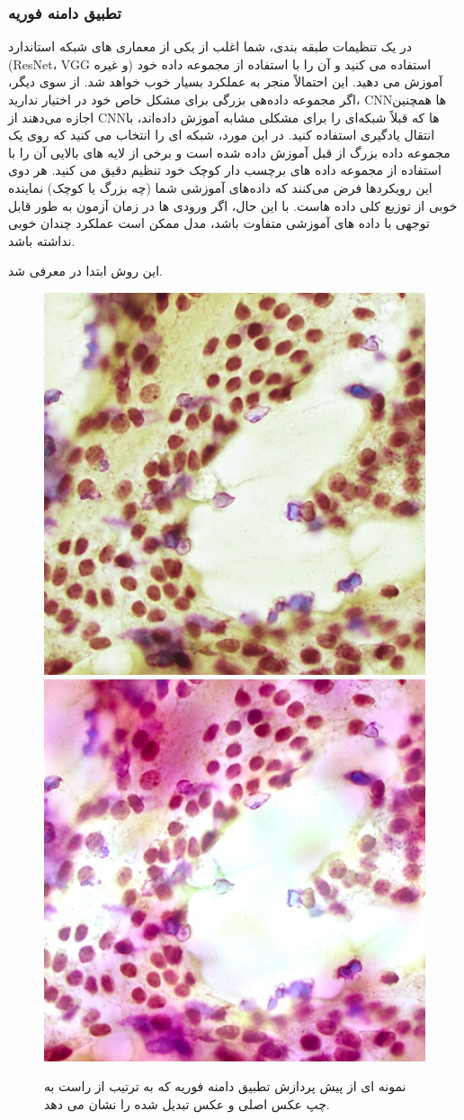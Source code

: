 \subsubsection{تطبیق دامنه فوریه}
در یک تنظیمات طبقه بندی، شما اغلب از یکی از معماری های شبکه استاندارد (ResNet، VGG و غیره) استفاده می کنید و آن را با استفاده از مجموعه داده خود آموزش می دهید.
این احتمالاً منجر به عملکرد بسیار خوب خواهد شد.
از سوی دیگر، اگر مجموعه داده‌هی بزرگی برای مشکل خاص خود در اختیار ندارید، CNN‌ها همچنین اجازه می‌دهند از CNNها که قبلاً شبکه‌ای را برای مشکلی مشابه آموزش داده‌اند، با انتقال یادگیری استفاده کنید.
در این مورد، شبکه ای را انتخاب می کنید که روی یک مجموعه داده بزرگ از قبل آموزش داده شده است و برخی از لایه های بالایی آن را با استفاده از مجموعه داده های برچسب دار کوچک خود تنظیم دقیق می کنید.
هر دوی این رویکردها فرض می‌کنند که داده‌های آموزشی شما (چه بزرگ یا کوچک) نماینده خوبی از توزیع کلی داده هاست.
با این حال، اگر ورودی ها در زمان آزمون به طور قابل توجهی با داده های آموزشی متفاوت باشد، مدل ممکن است عملکرد چندان خوبی نداشته باشد.

این روش ابتدا در \cite{testi} معرفی شد.
\begin{figure}
    \begin{center}
        \includegraphics[width=0.48\linewidth]{figs/suggested_methods/subs/data_augmentation/fda_1054-original.jpeg}
        \includegraphics[width=0.48\linewidth]{figs/suggested_methods/subs/data_augmentation/fda_1054-transformed.jpeg}
    \end{center}
    \caption{نمونه ای از پیش پردازش تطبیق دامنه فوریه که به ترتیب از راست به چپ عکس اصلی و عکس تبدیل شده را نشان می دهد.}
    \label{شکل: fda augmentation}
\end{figure}

